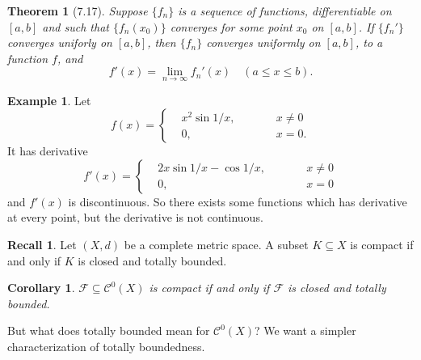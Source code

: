 \documentclass[12pt]{article}
\theoremstyle{plain}
\newtheorem{thm}{Theorem}
\newtheorem*{corollary}{Corollary}
\theoremstyle{definition}
\newtheorem*{eg}{Example}
\newtheorem*{recall}{Recall}
\begin{document}
\begin{thm}[7.17]
    Suppose $\{f_n\}$ is a sequence of functions, differentiable on $[a,b]$ and such
    that $\{f_n(x_0)\}$ converges for some point $x_0$ on $[a,b]$.
    If $\{f_n'\}$ converges uniforly on $[a,b]$, then $\{f_n\}$ converges uniformly
    on $[a,b]$, to a function $f$, and
    $$f'(x)=\lim_{n\rightarrow\infty}f_n'(x)\quad(a\leq x\leq b).$$
\end{thm}

\begin{eg}
    Let 
    $$f(x)=\left\{
       \begin{aligned}
           &x^2\sin 1/x,\qquad &&x\neq0\\
           &0,&&x=0.
       \end{aligned}
    \right.$$
    It has derivative
    $$f'(x)=\left\{
        \begin{aligned}
            &2x\sin 1/x-\cos 1/x,\qquad &&x\neq0\\
            &0,&&x=0
        \end{aligned}
    \right.$$
    and $f'(x)$ is discontinuous.
    So there exists some functions which has derivative at every point, but the
    derivative is not continuous.
\end{eg}

\begin{recall}
    Let $(X,d)$ be a complete metric space. 
    A subset $K\subseteq X$ is compact if and only if $K$ is closed and totally
    bounded.
\end{recall}
\begin{corollary}
    $\mathcal{F}\subseteq\mathcal{C}^0(X)$ is compact if and only if
    $\mathcal{F}$ is closed and totally bounded.
\end{corollary}
But what does totally bounded mean for $\mathcal{C}^0(X)$?
We want a simpler characterization of totally boundedness.
\end{document}
